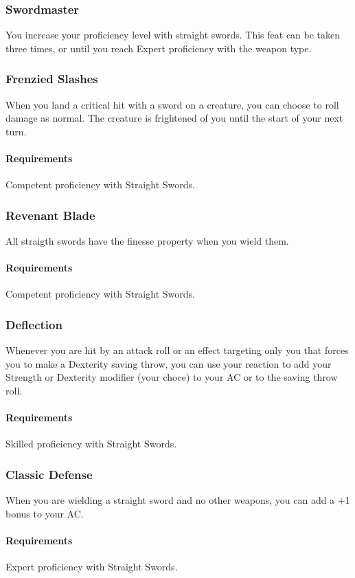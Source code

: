 \subsubsection{Swordmaster} \label{feat::swordmaster}
    You increase your proficiency level with straight swords.
    This feat can be taken three times, or until you reach Expert proficiency with the weapon type.
\subsubsection{Frenzied Slashes} \label{feat::frenziedslashes}
    When you land a critical hit with a sword on a creature, you can choose to roll damage as normal.
    The creature is frightened of you until the start of your next turn.
    \paragraph{Requirements} Competent proficiency with Straight Swords.
\subsubsection{Revenant Blade} \label{feat::revenantblade}
    All straigth swords have the finesse property when you wield them.
    \paragraph{Requirements} Competent proficiency with Straight Swords.
\subsubsection{Deflection} \label{feat::deflection}
    Whenever you are hit by an attack roll or an effect targeting only you that forces you to make a Dexterity saving throw, you can use your reaction to add your Strength or Dexterity modifier (your choce) to your AC or to the saving throw roll.
    \paragraph{Requirements} Skilled proficiency with Straight Swords.
\subsubsection{Classic Defense} \label{feat::classicdefense}
    When you are wielding a straight sword and no other weapons, you can add a +1 bonus to your AC.
    \paragraph{Requirements} Expert proficiency with Straight Swords.
